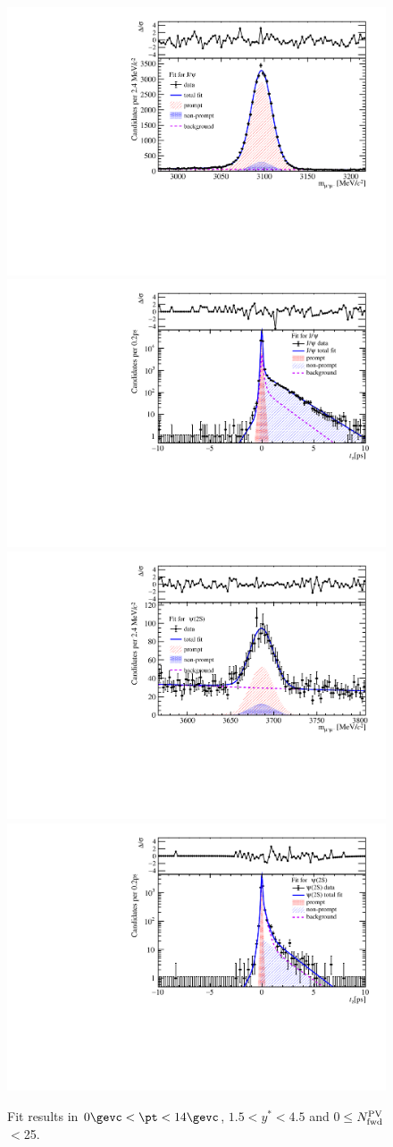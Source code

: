 \begin{figure}[H]
\begin{center}
\includegraphics[width=0.45\linewidth]{pdf/Pbp/FWorkdir/TwoDimFit/ProjMass/Jpsi_n1y1pt1.pdf}
\includegraphics[width=0.45\linewidth]{pdf/Pbp/FWorkdir/TwoDimFit/ProjTz/Jpsi_n1y1pt1.pdf}
\vspace*{-0.5cm}
\includegraphics[width=0.45\linewidth]{pdf/Pbp/FWorkdir/TwoDimFit/ProjMass/Psi2S_n1y1pt1.pdf}
\includegraphics[width=0.45\linewidth]{pdf/Pbp/FWorkdir/TwoDimFit/ProjTz/Psi2S_n1y1pt1.pdf}
\vspace*{-0.5cm}
\end{center}
\caption{Fit results in $0\gevc<\pt<14\gevc$, $1.5<y^*<4.5$ and 0$\leq$$N_{\rm fwd}^{\rm PV}$$<$25.}
\end{figure}
